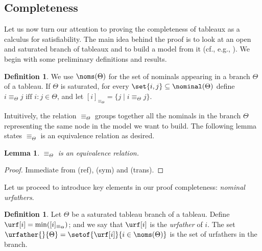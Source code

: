 \documentclass[10pt,a4paper]{amsart}
\newtheorem{lem}[thm]{Lemma}
\theoremstyle{definition}
\newtheorem{defi}[thm]{Definition}
\theoremstyle{remark}
\begin{document}
\subsection{Completeness}\label{sec:completeness}

Let us now turn our attention to proving the completeness of tableaux as a calculus for satisfiability.
The main idea behind the proof is to look at an open and saturated branch of tableaux and to build a model from it (cf., e.g., \cite{Fit83,Fit96,Priest08}).
We begin with some preliminary definitions and results.


\begin{defi}
    \label{def:prefixrelation}
    We use $\noms(\Theta)$ for the set of nominals appearing in a branch $\Theta$ of a tableau. 
    If $\Theta$ is saturated, for every $\set{i,j} \subseteq \nominal(\Theta)$ define
    $i \equiv_\Theta j \mbox{ iff } i{:}j \in \Theta$, and let $[i]_{\equiv_{\Theta}} = \{ j \mid i \equiv_\Theta j\}$.
\end{defi}

Intuitively, the relation $\equiv_\Theta$ groups together all the nominals in the branch $\Theta$ representing the same node in the model we want to build.
The following lemma states $\equiv_\Theta$ is an equivalence relation as desired.

\begin{lem}
    \label{lemma:equiv-prefixrelation}
    $\equiv_\Theta$ is an equivalence relation.
\end{lem}
\begin{proof}
Immediate from (ref), (sym) and (trans).
\end{proof}

Let us proceed to introduce key elements in our proof completeness: \emph{nominal urfathers}.

\begin{defi}\label{def:urfather} 
    Let $\Theta$ be a saturated tableau branch of a tableau.
    Define $\urf[i]=\min([i]_{\equiv_{\Theta}})$; and we say that
$\urf[i]$ is the \emph{urfather} of $i$.
    The set $\urfather{}{\Theta} = \setof{\urf[i]}{i \in \noms(\Theta)}$ is the set of urfathers in the branch.
\end{defi}
\end{document}
